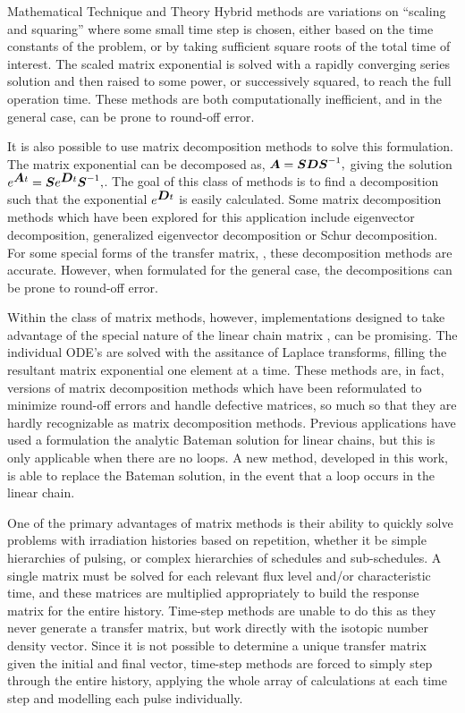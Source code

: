 \begin{chapter}{Mathematical Technique and Theory}
Hybrid methods are variations on ``scaling and squaring'' where some
small time step is chosen, either based on the time constants of the
problem, or by taking sufficient square roots of the total time of
interest.  The scaled matrix exponential is solved with a rapidly
converging series solution and then raised to some power, or
successively squared, to reach the full operation time.  These methods
are both computationally inefficient, and in the general case, can be
prone to round-off error.

It is also possible to use matrix decomposition methods to solve this
formulation.  The matrix exponential can be decomposed as, $\mbox{\boldmath $A$} =
\mbox{\boldmath $S$}\mbox{\boldmath $D$}\mbox{\boldmath $S$}^{-1},$ giving the solution $e^{\mbox{\boldmath $A$} t} =
\mbox{\boldmath $S$}e^{\mbox{\boldmath $D$} t}\mbox{\boldmath $S$}^{-1},$.  The goal of this class of methods
is to find a decomposition such that the exponential $e^{\mbox{\boldmath $D$} t}$
is easily calculated. Some matrix decomposition methods which have
been explored for this application include eigenvector decomposition,
generalized eigenvector decomposition or Schur decomposition.  For
some special forms of the transfer matrix, , these
decomposition methods are accurate.  However, when formulated for the
general case, the decompositions can be prone to round-off error.

Within the class of matrix methods, however, implementations designed
to take advantage of the special nature of the linear chain matrix
, can be promising.  The individual ODE's are solved with the
assitance of Laplace transforms, filling the resultant matrix
exponential one element at a time.  These methods are, in fact,
versions of matrix decomposition methods which have been reformulated
to minimize round-off errors and handle defective matrices, so much so
that they are hardly recognizable as matrix decomposition methods.
Previous applications have used a formulation the analytic Bateman
solution for linear chains, but this is only applicable when there are
no loops.  A new method, developed in this work, is able to replace
the Bateman solution, in the event that a loop occurs in the linear
chain.

One of the primary advantages of matrix methods is their ability to
quickly solve problems with irradiation histories based on repetition,
whether it be simple hierarchies of pulsing, or complex hierarchies of
schedules and sub-schedules.  A single matrix must be solved for each
relevant flux level and/or characteristic time, and these matrices are
multiplied appropriately to build the response matrix for the entire
history.  Time-step methods are unable to do this as they never
generate a transfer matrix, but work directly with the isotopic number
density vector.  Since it is not possible to determine a unique
transfer matrix given the initial and final vector, time-step methods
are forced to simply step through the entire history, applying the
whole array of calculations at each time step and modelling each pulse
individually.


\end{chapter}
